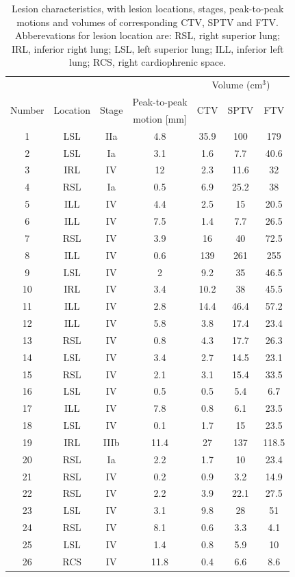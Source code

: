 \documentclass[type=dr, dr=rernat, acm$^3$entcolor=tud7b,colorbacktitle, bigchapter, openright, twoside, 12pt ]{tudthesis}
\begin{document}
\begin{table}[H]
  \centering
  \caption{Lesion characteristics, with lesion locations, stages, peak-to-peak motions and volumes of corresponding CTV, SPTV and FTV. Abberevations for lesion location are: 
  RSL, right superior lung; IRL, inferior right lung; LSL, left superior lung; ILL, inferior left lung; RCS, right cardiophrenic space.}
  \begin{tabular}{|c|c|c|c|c|c|c|}
    \hline\hline
     & & & & \multicolumn{3}{|c|}{Volume (cm$^3$)} \\ \cline{5-7}
    \multirow{2}{*}{Number} & \multirow{2}{*}{Location} & \multirow{2}{*}{Stage} &
    Peak-to-peak & \multirow{2}{*}{CTV} & \multirow{2}{*}{SPTV} & \multirow{2}{*}{FTV}\\
     &  & & motion [mm] & & & \\
    \hline
    1 & LSL & IIa & 4.8 & 35.9 & 100 & 179 \\
    2 & LSL & Ia & 3.1 & 1.6 & 7.7 & 40.6 \\
    3 & IRL & IV & 12 & 2.3 & 11.6 & 32 \\
    4 & RSL & Ia & 0.5 & 6.9 & 25.2 & 38 \\
    5 & ILL & IV & 4.4 & 2.5 & 15 & 20.5 \\
    6 & ILL & IV & 7.5 & 1.4 & 7.7 & 26.5 \\
    7 & RSL & IV & 3.9 & 16 & 40 & 72.5 \\
    8 & ILL & IV & 0.6 & 139 & 261 & 255 \\
    9 & LSL & IV & 2 & 9.2 & 35 & 46.5 \\
    10 & IRL & IV & 3.4 & 10.2 & 38 & 45.5 \\
    11 & ILL & IV & 2.8 & 14.4 & 46.4 & 57.2 \\
    12 & ILL & IV & 5.8 & 3.8 & 17.4 & 23.4 \\
    13 & RSL & IV & 0.8 & 4.3 & 17.7 & 26.3 \\
    14 & LSL & IV & 3.4 & 2.7 & 14.5 & 23.1 \\
    15 & RSL & IV & 2.1 & 3.1 & 15.4 & 33.5 \\
    16 & LSL & IV & 0.5 & 0.5 & 5.4 & 6.7 \\
    17 & ILL & IV & 7.8 & 0.8 & 6.1 & 23.5 \\
    18 & LSL & IV & 0.1 & 1.7 & 15 & 23.5 \\
    19 & IRL & IIIb & 11.4 & 27 & 137 & 118.5 \\
    20 & RSL & Ia & 2.2 & 1.7 & 10 & 23.4 \\
    21 & RSL & IV & 0.2 & 0.9 & 3.2 & 14.9 \\
    22 & RSL & IV & 2.2 & 3.9 & 22.1 & 27.5 \\
    23 & LSL & IV & 3.1 & 9.8 & 28 & 51 \\
    24 & RSL & IV & 8.1 & 0.6 & 3.3 & 4.1 \\
    25 & LSL & IV & 1.4 & 0.8 & 5.9 & 10 \\
    26 & RCS & IV & 11.8 & 0.4 & 6.6 & 8.6 \\

    \hline\hline
  \end{tabular}
  \label{tab:patdata}
\end{table}
\end{document}

